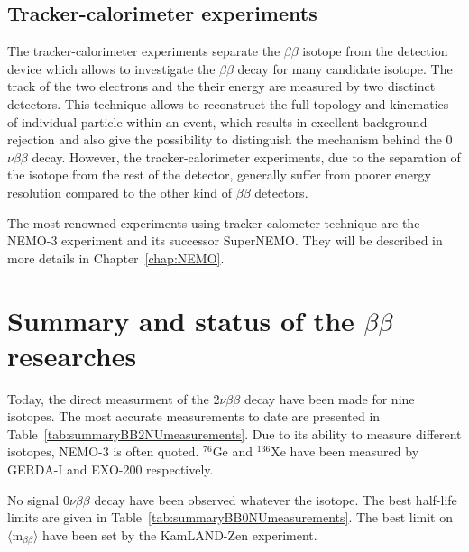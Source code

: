 \documentclass[main.tex]{subfiles}
\begin{document}
\subsection{Tracker-calorimeter experiments}


\NI The tracker-calorimeter experiments separate the $\beta\beta$ isotope from the detection device which allows to investigate the $\beta\beta$ decay for many candidate isotope. The track of the two electrons and the their energy are measured by two disctinct detectors. This technique allows to reconstruct the full topology and kinematics of individual particle within an event, which results in excellent background rejection and also give the possibility to distinguish the mechanism behind the 0$\nu\beta\beta$ decay. However, the tracker-calorimeter experiments, due to the separation of the isotope from the rest of the detector, generally suffer from poorer energy resolution compared to the other kind of $\beta\beta$ detectors. 


\bigskip


\NI The most renowned experiments using tracker-calometer technique are the NEMO-3 experiment and its successor SuperNEMO. They will be described in more details in Chapter~\ref{chap:NEMO}.


\section{Summary and status of the $\beta\beta$ researches}\label{sec:StatusDBD}


\NI Today, the direct measurment of the 2$\nu\beta\beta$ decay have been made for nine isotopes. The most accurate measurements to date are presented in Table~\ref{tab:summaryBB2NUmeasurements}. Due to its ability to measure different isotopes, NEMO-3 is often quoted. $^{\text{76}}$Ge and $^{\text{136}}$Xe have been measured by GERDA-I and EXO-200 respectively.


\bigskip


\NI No signal 0$\nu\beta\beta$ decay have been observed whatever the isotope. The best half-life limits are given in Table~\ref{tab:summaryBB0NUmeasurements}. The best limit on $\langle \text{m}_{\beta\beta} \rangle$ have been set by the KamLAND-Zen experiment.


\bigskip
\end{document}
